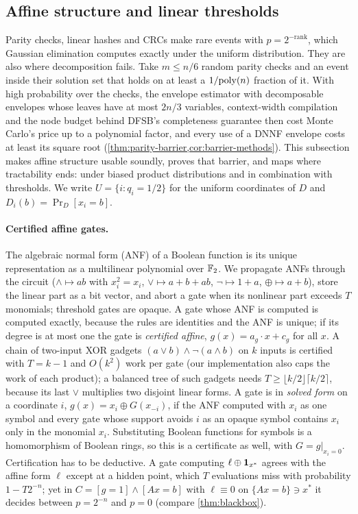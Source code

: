 \subsection{Affine structure and linear thresholds}\label{sec:affine}

Parity checks, linear hashes and CRCs make rare events with $p=2^{-\mathrm{rank}}$,
which Gaussian elimination computes exactly under the uniform distribution. They are
also where decomposition fails. Take $m\le n/6$ random parity checks and an event
inside their solution set that holds on at least a $1/\mathrm{poly}(n)$ fraction of it. With
high probability over the checks, the envelope estimator with decomposable
envelopes whose leaves have at most $2n/3$ variables, context-width compilation and the
node budget behind DFSB's completeness
guarantee then cost Monte Carlo's price up to a polynomial factor, and every use of a
DNNF envelope costs at least its square root
(\cref{thm:parity-barrier,cor:barrier-methods}). This subsection
makes affine structure usable soundly, proves that barrier, and maps where
tractability ends: under biased product distributions and in combination with
thresholds. We write $U=\{i:q_i=1/2\}$ for the uniform coordinates of $D$ and
$D_i(b)=\Pr_D[x_i=b]$.

\paragraph{Certified affine gates.}
The algebraic normal form (ANF) of a Boolean function is its unique representation
as a multilinear polynomial over $\mathbb{F}_2$. We propagate ANFs through the circuit
($\wedge\mapsto ab$ with $x_i^2=x_i$, $\vee\mapsto a+b+ab$, $\neg\mapsto1+a$,
$\oplus\mapsto a+b$), store the linear part as a bit vector, and abort a gate when
its nonlinear part exceeds $T$ monomials; threshold gates are opaque. A gate whose
ANF is computed is computed exactly, because the rules are identities and the ANF is
unique; if its degree is at most one the gate is \emph{certified affine},
$g(x)=a_g\cdot x+c_g$ for all $x$. A chain of two-input XOR gadgets
$(a\vee b)\wedge\neg(a\wedge b)$ on $k$ inputs is certified with $T=k-1$ and $O(k^2)$
work per gate (our implementation also caps the work of each product); a balanced
tree of such gadgets needs $T\ge\lfloor k/2\rfloor\lceil k/2\rceil$, because its last
$\vee$ multiplies two disjoint linear forms. A gate is in \emph{solved form} on a coordinate $i$,
$g(x)=x_i\oplus G(x_{-i})$, if the ANF computed with $x_i$ as one symbol and every
gate whose support avoids $i$ as an opaque symbol contains $x_i$ only in the
monomial $x_i$. Substituting Boolean functions for symbols is a homomorphism of
Boolean rings, so this is a certificate as well, with $G=g|_{x_i=0}$. Certification
has to be deductive. A gate computing $\ell\oplus\mathbf{1}_{x^*}$ agrees with the affine
form $\ell$ except at a hidden point, which $T$ evaluations miss with probability
$1-T2^{-n}$; yet in $C=[g=1]\wedge[Ax=b]$ with $\ell\equiv0$ on $\{Ax=b\}\ni x^*$ it
decides between $p=2^{-n}$ and $p=0$ (compare \cref{thm:blackbox}).

